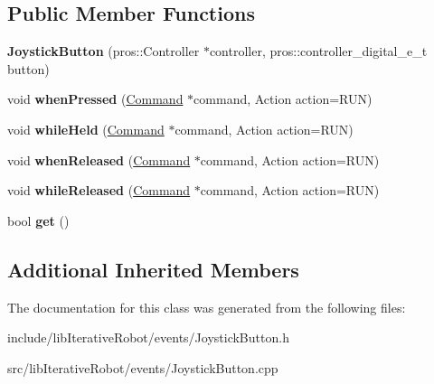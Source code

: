 \subsection*{Public Member Functions}
\begin{DoxyCompactItemize}
\item 
\mbox{\label{classlib_iterative_robot_1_1_joystick_button_af34169116bcab8a1b5868dddc745e5ec}} 
{\bfseries Joystick\+Button} (pros\+::\+Controller $\ast$controller, pros\+::controller\+\_\+digital\+\_\+e\+\_\+t button)
\item 
\mbox{\label{classlib_iterative_robot_1_1_joystick_button_ad3c08c71a1ccd81db8578bdbc10ff8f4}} 
void {\bfseries when\+Pressed} (\mbox{\hyperlink{classlib_iterative_robot_1_1_command}{Command}} $\ast$command, Action action=R\+UN)
\item 
\mbox{\label{classlib_iterative_robot_1_1_joystick_button_ac9e126abbcbf327f9390a82b7e953ec5}} 
void {\bfseries while\+Held} (\mbox{\hyperlink{classlib_iterative_robot_1_1_command}{Command}} $\ast$command, Action action=R\+UN)
\item 
\mbox{\label{classlib_iterative_robot_1_1_joystick_button_ac0d12fea8cd3fa4c25a2cd7eefaeef67}} 
void {\bfseries when\+Released} (\mbox{\hyperlink{classlib_iterative_robot_1_1_command}{Command}} $\ast$command, Action action=R\+UN)
\item 
\mbox{\label{classlib_iterative_robot_1_1_joystick_button_a36cb5b1a9c9277a2c4d1ef579e14dbe9}} 
void {\bfseries while\+Released} (\mbox{\hyperlink{classlib_iterative_robot_1_1_command}{Command}} $\ast$command, Action action=R\+UN)
\item 
\mbox{\label{classlib_iterative_robot_1_1_joystick_button_ab6f0b1d3362cc9ceae240712e8ef03a5}} 
bool {\bfseries get} ()
\end{DoxyCompactItemize}
\subsection*{Additional Inherited Members}


The documentation for this class was generated from the following files\+:\begin{DoxyCompactItemize}
\item 
include/lib\+Iterative\+Robot/events/Joystick\+Button.\+h\item 
src/lib\+Iterative\+Robot/events/Joystick\+Button.\+cpp\end{DoxyCompactItemize}
